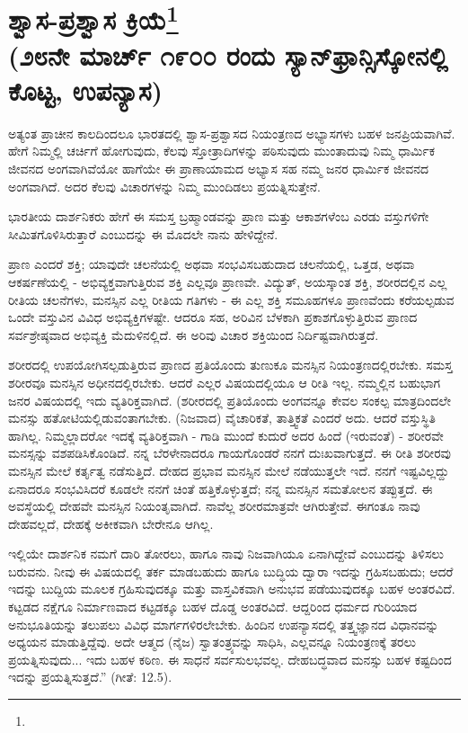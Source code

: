 
\chapter{ಶ್ವಾಸ-ಪ್ರಶ್ವಾಸ ಕ್ರಿಯೆ\protect\footnote{}\\(೨೮ನೇ ಮಾರ್ಚ್ ೧೯೦೦ ರಂದು ಸ್ಯಾನ್‌ಫ್ರಾನ್ಸಿಸ್ಕೋನಲ್ಲಿ ಕೊಟ್ಟ, ಉಪನ್ಯಾಸ)}

ಅತ್ಯಂತ ಪ್ರಾಚೀನ ಕಾಲದಿಂದಲೂ ಭಾರತದಲ್ಲಿ ಶ್ವಾಸ-ಪ್ರಶ್ವಾಸದ ನಿಯಂತ್ರಣದ ಅಭ್ಯಾಸಗಳು ಬಹಳ ಜನಪ್ರಿಯವಾಗಿವೆ. ಹೇಗೆ ನಿಮ್ಮಲ್ಲಿ ಚರ್ಚಿಗೆ ಹೋಗುವುದು, ಕೆಲವು ಸ್ತೋತ್ರಾದಿಗಳನ್ನು ಪಠಿಸುವುದು ಮುಂತಾದುವು ನಿಮ್ಮ ಧಾರ್ಮಿಕ ಜೀವನದ ಅಂಗವಾಗಿವೆಯೋ ಹಾಗೆಯೇ ಈ ಪ್ರಾಣಾಯಾಮದ ಅಭ್ಯಾಸ ಸಹ ನಮ್ಮ ಜನರ ಧಾರ್ಮಿಕ ಜೀವನದ ಅಂಗವಾಗಿದೆ. ಅದರ ಕೆಲವು ವಿಚಾರಗಳನ್ನು ನಿಮ್ಮ ಮುಂದಿಡಲು ಪ್ರಯತ್ನಿಸುತ್ತೇನೆ.

ಭಾರತೀಯ ದಾರ್ಶನಿಕರು ಹೇಗೆ ಈ ಸಮಸ್ತ ಬ್ರಹ್ಮಾಂಡವನ್ನು ಪ್ರಾಣ ಮತ್ತು ಆಕಾಶಗಳೆಂಬ ಎರಡು ವಸ್ತುಗಳಿಗೇ ಸೀಮಿತಗೊಳಿಸಿರುತ್ತಾರೆ ಎಂಬುದನ್ನು ಈ ಮೊದಲೇ ನಾನು ಹೇಳಿದ್ದೇನೆ.

ಪ್ರಾಣ ಎಂದರೆ ಶಕ್ತಿ; ಯಾವುದೇ ಚಲನೆಯಲ್ಲಿ ಅಥವಾ ಸಂಭವಿಸಬಹುದಾದ ಚಲನೆಯಲ್ಲಿ, ಒತ್ತಡ, ಅಥವಾ ಆಕರ್ಷಣೆಯಲ್ಲಿ - ಅಭಿವ್ಯಕ್ತವಾಗುತ್ತಿರುವ ಶಕ್ತಿ ಎಲ್ಲವೂ ಪ್ರಾಣವೇ. ವಿದ್ಯುತ್, ಅಯಸ್ಕಾಂತ ಶಕ್ತಿ, ಶರೀರದಲ್ಲಿನ ಎಲ್ಲ ರೀತಿಯ ಚಲನೆಗಳು, ಮನಸ್ಸಿನ ಎಲ್ಲ ರೀತಿಯ ಗತಿಗಳು - ಈ ಎಲ್ಲ ಶಕ್ತಿ ಸಮೂಹಗಳೂ ಪ್ರಾಣವೆಂದು ಕರೆಯಲ್ಪಡುವ ಒಂದೇ ವಸ್ತುವಿನ ವಿವಿಧ ಅಭಿವ್ಯಕ್ತಿಗಳಷ್ಟೇ. ಆದರೂ ಸಹ, ಅರಿವಿನ ಬೆಳಕಾಗಿ ಪ್ರಕಾಶಗೊಳ್ಳುತ್ತಿರುವ ಪ್ರಾಣದ ಸರ್ವಶ್ರೇಷ್ಠವಾದ ಅಭಿವ್ಯಕ್ತಿ ಮೆದುಳಿನಲ್ಲಿದೆ. ಈ ಅರಿವು ವಿಚಾರ ಶಕ್ತಿಯಿಂದ ನಿರ್ದಿಷ್ಟವಾಗಿರುತ್ತದೆ.

ಶರೀರದಲ್ಲಿ ಉಪಯೋಗಿಸಲ್ಪಡುತ್ತಿರುವ ಪ್ರಾಣದ ಪ್ರತಿಯೊಂದು ತುಣುಕೂ ಮನಸ್ಸಿನ ನಿಯಂತ್ರಣದಲ್ಲಿರಬೇಕು. ಸಮಸ್ತ ಶರೀರವೂ ಮನಸ್ಸಿನ ಅಧೀನದಲ್ಲಿರಬೇಕು. ಆದರೆ ಎಲ್ಲರ ವಿಷಯದಲ್ಲಿಯೂ ಆ ರೀತಿ ಇಲ್ಲ. ನಮ್ಮಲ್ಲಿನ ಬಹುಭಾಗ ಜನರ ವಿಷಯದಲ್ಲಿ ಇದು ವ್ಯತಿರಿಕ್ತವಾಗಿದೆ. (ಶರೀರದಲ್ಲಿ ಪ್ರತಿಯೊಂದು ಅಂಗವನ್ನೂ ಕೇವಲ ಸಂಕಲ್ಪ ಮಾತ್ರದಿಂದಲೇ ಮನಸ್ಸು ಹತೋಟಿಯಲ್ಲಿಡುವಂತಾಗಬೇಕು. (ನಿಜವಾದ) ವೈಚಾರಿಕತೆ, ತಾತ್ತ್ವಿಕತೆ ಎಂದರೆ ಅದು. ಆದರೆ ವಸ್ತುಸ್ಥಿತಿ ಹಾಗಿಲ್ಲ. ನಿಮ್ಮಲ್ಲಾದರೋ ಇದಕ್ಕೆ ವ್ಯತಿರಿಕ್ತವಾಗಿ - ಗಾಡಿ ಮುಂದೆ ಕುದುರೆ ಅದರ ಹಿಂದೆ (ಇರುವಂತೆ) - ಶರೀರವೇ ಮನಸ್ಸನ್ನು ವಶಪಡಿಸಿಕೊಂಡಿದೆ. ನನ್ನ ಬೆರಳೇನಾದರೂ ಗಾಯಗೊಂಡರೆ ನನಗೆ ದುಃಖವಾಗುತ್ತದೆ. ಈ ರೀತಿ ಶರೀರವು ಮನಸ್ಸಿನ ಮೇಲೆ ಕರ್ತೃತ್ವ ನಡೆಸುತ್ತಿದೆ. ದೇಹದ ಪ್ರಭಾವ ಮನಸ್ಸಿನ ಮೇಲೆ ನಡೆಯುತ್ತಲೇ ಇದೆ. ನನಗೆ ಇಷ್ಟವಿಲ್ಲದ್ದು ಏನಾದರೂ ಸಂಭವಿಸಿದರೆ ಕೂಡಲೇ ನನಗೆ ಚಿಂತೆ ಹತ್ತಿಕೊಳ್ಳುತ್ತದೆ; ನನ್ನ ಮನಸ್ಸಿನ ಸಮತೋಲನ ತಪ್ಪುತ್ತದೆ. ಈ ಅವಸ್ಥೆಯಲ್ಲಿ ದೇಹವೇ ಮನಸ್ಸಿನ ನಿಯಂತೃವಾಗಿದೆ. ನಾವೆಲ್ಲ ಶರೀರಮಾತ್ರವೇ ಆಗಿರುತ್ತೇವೆ. ಈಗಂತೂ ನಾವು ದೇಹವಲ್ಲದೆ, ದೇಹಕ್ಕೆ ಅಕೀಕವಾಗಿ ಬೇರೇನೂ ಆಗಿಲ್ಲ.

ಇಲ್ಲಿಯೇ ದಾರ್ಶನಿಕ ನಮಗೆ ದಾರಿ ತೋರಲು, ಹಾಗೂ ನಾವು ನಿಜವಾಗಿಯೂ ಏನಾಗಿದ್ದೇವೆ ಎಂಬುದನ್ನು ತಿಳಿಸಲು ಬರುವನು. ನೀವು ಈ ವಿಷಯದಲ್ಲಿ ತರ್ಕ ಮಾಡಬಹುದು ಹಾಗೂ ಬುದ್ಧಿಯ ದ್ವಾರಾ ಇದನ್ನು ಗ್ರಹಿಸಬಹುದು; ಆದರೆ ಇದನ್ನು ಬುದ್ದಿಯ ಮೂಲಕ ಗ್ರಹಿಸುವುದಕ್ಕೂ ಮತ್ತು ವಾಸ್ತವಿಕವಾಗಿ ಅನುಭವ ಪಡೆಯುವುದಕ್ಕೂ ಬಹಳ ಅಂತರವಿದೆ. ಕಟ್ಟಡದ ನಕ್ಷೆಗೂ ನಿರ್ಮಾಣವಾದ ಕಟ್ಟಡಕ್ಕೂ ಬಹಳ ದೊಡ್ಡ ಅಂತರವಿದೆ. ಆದ್ದರಿಂದ ಧರ್ಮದ ಗುರಿಯಾದ ಅನುಭೂತಿಯನ್ನು ತಲುಪಲು ವಿವಿಧ ಮಾರ್ಗಗಳಿರಲೇಬೇಕು. ಹಿಂದಿನ ಉಪನ್ಯಾಸದಲ್ಲಿ ತತ್ತ್ವಜ್ಞಾನದ ವಿಧಾನವನ್ನು ಅಧ್ಯಯನ ಮಾಡುತ್ತಿದ್ದೆವು. ಅದೇ ಆತ್ಮದ (ನೈಜ) ಸ್ವಾತಂತ್ರ್ಯವನ್ನು ಸಾಧಿಸಿ, ಎಲ್ಲವನ್ನೂ ನಿಯಂತ್ರಣಕ್ಕೆ ತರಲು ಪ್ರಯತ್ನಿಸುವುದು... ಇದು ಬಹಳ ಕಠಿಣ. ಈ ಸಾಧನೆ ಸರ್ವಸುಲಭವಲ್ಲ. ದೇಹಬದ್ಧವಾದ ಮನಸ್ಸು ಬಹಳ ಕಷ್ಟದಿಂದ ಇದನ್ನು ಪ್ರಯತ್ನಿಸುತ್ತದೆ.” (ಗೀತೆ: 12.5).

